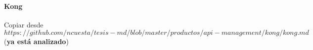 \paragraph{Kong}
\label{soa:tecnologias:kong}

Copiar desde $https://github.com/ncuesta/tesis-md/blob/master/productos/api-management/kong/kong.md$ (\textbf{ya está analizado})
